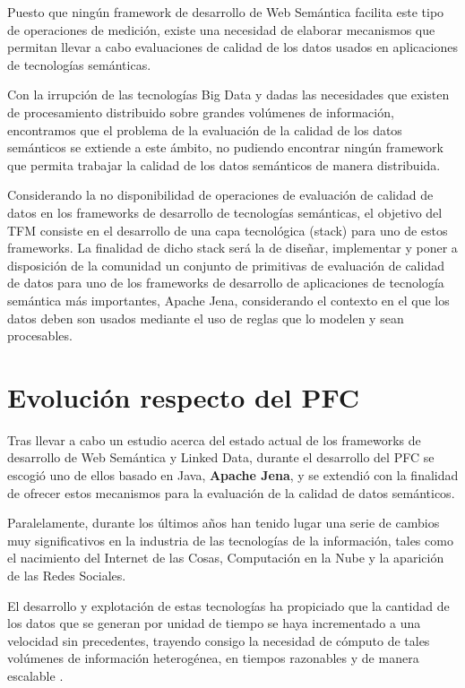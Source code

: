 Puesto que ningún framework de desarrollo de Web Semántica facilita este tipo de
operaciones de medición, existe una necesidad de elaborar
mecanismos que permitan llevar a cabo evaluaciones de calidad de los datos
usados en aplicaciones de tecnologías semánticas.


Con la irrupción de las tecnologías Big Data y dadas las necesidades que existen
de procesamiento distribuido sobre grandes volúmenes de información, encontramos
que el problema de la evaluación de la calidad de los datos semánticos se
extiende a este ámbito, no pudiendo encontrar ningún framework que permita
trabajar la calidad de los datos semánticos de manera distribuida. 

Considerando la no disponibilidad de operaciones de evaluación de calidad de datos en los
frameworks de desarrollo de tecnologías semánticas, el objetivo del \acf{TFM}
consiste en el desarrollo de una capa tecnológica (stack) para uno de estos frameworks. La finalidad de
dicho stack será la de diseñar, implementar y poner a disposición de la
comunidad un conjunto de primitivas de evaluación de calidad de datos para uno de
los frameworks de desarrollo de aplicaciones de tecnología semántica más
importantes, Apache Jena, considerando el contexto en el que los
datos deben son usados mediante el uso de reglas que lo modelen y sean procesables.


\section{Evolución respecto del PFC}

Tras llevar a cabo un estudio acerca del estado actual de los frameworks de
desarrollo de Web Semántica y Linked Data, durante el desarrollo del \acf{PFC}
se escogió uno de ellos basado en
Java, \textbf{Apache Jena}, y se extendió con la finalidad de ofrecer estos
mecanismos para la evaluación de la calidad de datos semánticos.

Paralelamente, durante los últimos años han tenido lugar una serie de cambios muy
significativos
en la industria de las tecnologías de la información, tales como el nacimiento
del Internet
de las Cosas, Computación en la Nube y la aparición de las Redes Sociales.


El desarrollo y explotación de estas tecnologías ha propiciado que la cantidad
de los datos
que se generan por unidad de tiempo se haya incrementado a una velocidad sin
precedentes,
trayendo consigo la necesidad de cómputo de tales volúmenes de información
heterogénea,
en tiempos razonables y de manera escalable \cite{map_reduce}.

